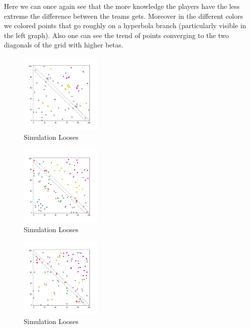 Here we can once again see that the more knowledge the players have the less extreme the difference between the teams gets. Moreover in the different colors we colored points that go roughly on a hyperbola branch (particularly visible in the left graph). Also one can see the trend of points converging to the two diagonals of the grid with higher betas.

\begin{figure}[!ht]
    \centering
    \includegraphics[width=0.35\textwidth]{Bilder/simulation_2_5}
    \caption{Simulation Looses}
    \label{fig:meine-grafik}
\end{figure}
\begin{figure}[!ht]
    \centering
    \includegraphics[width=0.35\textwidth]{Bilder/simulation_3_5}
    \caption{Simulation Looses}
    \label{fig:meine-grafik}
    \end{figure}
\begin{figure}[!ht]
    \centering
    \includegraphics[width=0.35\textwidth]{Bilder/simulation_4_5}
    \caption{Simulation Looses}
    \label{fig:meine-grafik}
\end{figure}

